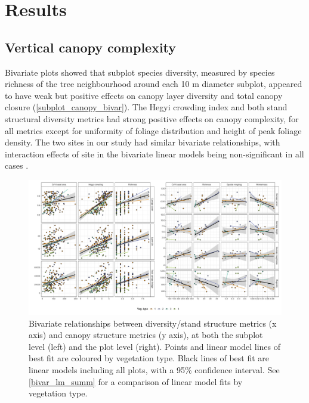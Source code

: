 \documentclass[11pt,a4paper]{article}
\begin{document}
\section{Results}

\subsection{Vertical canopy complexity}


Bivariate plots showed that subplot species diversity, measured by species richness of the tree neighbourhood around each 10 m diameter subplot, appeared to have weak but positive effects on canopy layer diversity and total canopy closure (\autoref{subplot_canopy_bivar}). The Hegyi crowding index and both stand structural diversity metrics had strong positive effects on canopy complexity, for all metrics except for uniformity of foliage distribution and height of peak foliage density. The two sites in our study had similar bivariate relationships, with interaction effects of site in the bivariate linear models being non-significant in all cases .

\begin{landscape}
\begin{figure}
	\includegraphics[width=\linewidth]{bivar}
	\caption{Bivariate relationships between diversity/stand structure metrics (x axis) and canopy structure metrics (y axis), at both the subplot level (left) and the plot level (right). Points and linear model lines of best fit are coloured by vegetation type. Black lines of best fit are linear models including all plots, with a 95\% confidence interval. See \autoref{bivar_lm_summ} for a comparison of linear model fits by vegetation type.}
	\label{subplot_canopy_bivar}
\end{figure}
\end{landscape}
\end{document}

